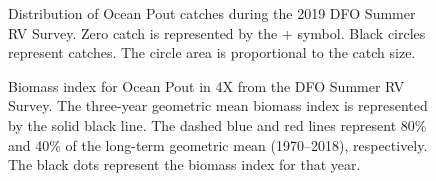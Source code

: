 \documentclass[11pt]{book}
\begin{document}
\begin{figure}[htb]

{\centering {} 

}

\caption{Distribution of Ocean Pout catches during the 2019 DFO Summer RV Survey. Zero catch is represented by the + symbol. Black circles represent catches. The circle area is proportional to the catch size.}\label{fig:118-map-oceanpout}
\end{figure}

\begin{figure}[htb]

{\centering {} 

}

\caption{Biomass index for Ocean Pout in 4X from the DFO Summer RV Survey. The three-year geometric mean biomass index is represented by the solid black line. The dashed blue and red lines represent 80\% and 40\% of the long-term geometric mean (1970--2018), respectively. The black dots represent the biomass index for that year.}\label{fig:119-fig-oceanpout-biomass4X}
\end{figure}
\end{document}
